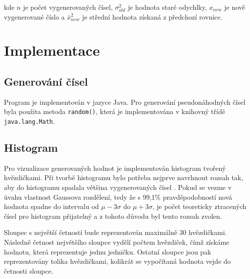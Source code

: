 \documentclass{article}
\begin{document}
kde \( n \) je počet vygenerovaných čísel, \( \sigma^{2}_{old} \) je hodnota staré odychlky,  \( x_{new} \) je nově vygenerované číslo a \( \bar{x}^{2}_{new}  \) je střední hodnota získaná z předchozí rovnice.

\section{Implementace}
\subsection{Generování čísel}
Program je implementován v jazyce Java. Pro generování pseudonáhodných čísel byla použita metoda \texttt{random()}, která je implementována v knihovný třídě \texttt{java.lang.Math}.
\subsection{Histogram}
Pro vizualizace generovaných hodnot je implementován histogram tvořený hvězdičkami. 
Při tvorbě histogramu bylo potřeba nejprve navrhnout rozsah tak, aby do histogramu spadala většina vygenerovaných čísel .
Pokud se vezme v úvahu vlastnost Gaussova rozdělení, tedy že s 99,1\% pravděpodobností nová hodnota spadne do intervalu od \( \mu -  3\sigma\) do \( \mu +  3\sigma\), je počet teoreticky ztracených čísel pro histogram přijatelný a z tohoto důvodu byl tento rozsah zvolen.

Sloupec s největší četností bude reprezentován maximálně 30 hvězdičkami. Následně četnost největšího sloupce vydělí počtem hvězdiček, čímž získáme hodnotu, která reprezentuje jednu jedničku. Ostatní sloupce jsou pak reprezentovány tolika hvězdičkami, kolikrát se vypočítaná hodnota vejde do četnosti sloupce.
\pagebreak
\end{document}
